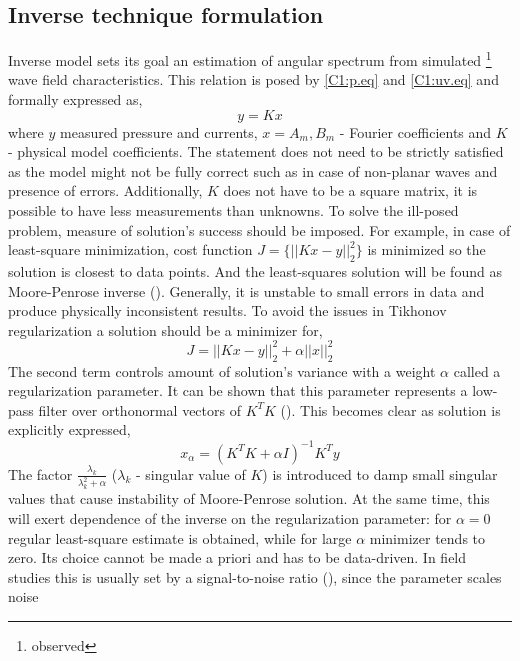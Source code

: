 \subsection{Inverse technique formulation}
Inverse model sets its goal an estimation of angular spectrum from simulated \footnote{observed} 
wave field characteristics. This relation is posed by \eqref{C1:p.eq} and \eqref{C1:uv.eq} and 
formally expressed as,
\begin{equation}
y = K x
\end{equation}
where $y$ measured pressure and currents, $x = {A_m, B_m}$ - Fourier coefficients and $K$ - 
physical model coefficients. The statement does not need to be strictly satisfied as the model 
might not be fully correct such as in case of non-planar waves and presence of errors. 
Additionally, $K$ does not have to be a square matrix, it is possible to have less measurements 
than unknowns. To solve the ill-posed problem, measure of solution's success should be imposed. For 
example, in case of least-square minimization, cost function $J = \{ ||K x - y||^2_2 \}$ is 
minimized so the solution is closest to data points. And the least-squares solution  
will be found as Moore-Penrose inverse (\cite{bennett1992inverse}). Generally, it is unstable to 
small errors in data and produce physically inconsistent results. To avoid the issues in Tikhonov 
regularization a solution should be a minimizer for,
\begin{equation}
\label{C1:Tikh_prob}
J = ||K x - y||^2_2 + \alpha ||x||^2_2
\end{equation}
The second term controls amount of solution's variance with a weight $\alpha$ called a 
regularization parameter. It can be shown that this parameter represents a low-pass filter over 
orthonormal vectors of $K^TK$ (\cite{williams2001regularization}). This becomes clear as solution 
is explicitly expressed,
\begin{equation}
\label{C1:Tikh_solution}
x_{\alpha} = (K^T K + \alpha I)^{-1} K^T y
\end{equation}
The factor $\frac{\lambda_k}{\lambda_k^2 + \alpha}$ ($\lambda_k$ - singular value of $K$) 
is introduced to damp small singular values that cause instability of Moore-Penrose solution. 
At the same time, this will exert dependence of the inverse on the regularization parameter: for 
$\alpha = 0$ regular least-square estimate is obtained, while for large $\alpha$ minimizer tends to 
zero. Its choice cannot be made a priori and has to be data-driven. In field studies this is 
usually set by a signal-to-noise ratio (\cite{munk2009ocean}), since the parameter scales noise 
